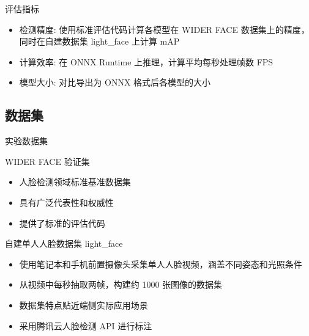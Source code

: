 \documentclass{beamer}
\begin{document}
\begin{frame}{评估指标}
    \begin{itemize}
        \item 检测精度: 使用标准评估代码计算各模型在 WIDER FACE 数据集上的精度，同时在自建数据集 light\_face 上计算 mAP
        \item 计算效率: 在 ONNX Runtime 上推理，计算平均每秒处理帧数 FPS
        \item 模型大小: 对比导出为 ONNX 格式后各模型的大小
    \end{itemize}
\end{frame}

\subsection{数据集}
\begin{frame}{实验数据集}
    \begin{block}{WIDER FACE 验证集}
        \begin{itemize}
            \item 人脸检测领域标准基准数据集
            \item 具有广泛代表性和权威性
            \item 提供了标准的评估代码
        \end{itemize}
    \end{block}

    \begin{block}{自建单人人脸数据集 light\_face}
        \begin{itemize}
            \item 使用笔记本和手机前置摄像头采集单人人脸视频，涵盖不同姿态和光照条件
            \item 从视频中每秒抽取两帧，构建约 1000 张图像的数据集
            \item 数据集特点贴近端侧实际应用场景
            \item 采用腾讯云人脸检测 API 进行标注
        \end{itemize}
    \end{block}
\end{frame}

\end{document}
